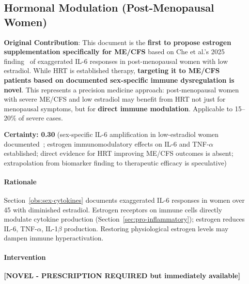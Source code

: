 \subsection{Hormonal Modulation (Post-Menopausal Women)}
\label{sec:hormonal-modulation}

\begin{speculation}
\label{spec:estrogen-immune-modulation}
\textbf{Original Contribution}: This document is the \textbf{first to propose estrogen supplementation specifically for ME/CFS} based on Che et al.'s 2025 finding~\cite{Che2025} of exaggerated IL-6 responses in post-menopausal women with low estradiol. While HRT is established therapy, \textbf{targeting it to ME/CFS patients based on documented sex-specific immune dysregulation is novel}. This represents a precision medicine approach: post-menopausal women with severe ME/CFS and low estradiol may benefit from HRT not just for menopausal symptoms, but for \textbf{direct immune modulation}. Applicable to 15--20\% of severe cases.

\textbf{Certainty: 0.30} (sex-specific IL-6 amplification in low-estradiol women documented~\cite{Che2025}; estrogen immunomodulatory effects on IL-6 and TNF-$\alpha$ established; direct evidence for HRT improving ME/CFS outcomes is absent; extrapolation from biomarker finding to therapeutic efficacy is speculative)
\end{speculation}

\paragraph{Rationale}
Section~\ref{obs:sex-cytokines} documents exaggerated IL-6 responses in women over 45 with diminished estradiol. Estrogen receptors on immune cells directly modulate cytokine production (Section~\ref{sec:pro-inflammatory}); estrogen reduces IL-6, TNF-$\alpha$, IL-1$\beta$ production. Restoring physiological estrogen levels may dampen immune hyperactivation.

\paragraph{Intervention}

\textbf{[NOVEL - PRESCRIPTION REQUIRED but immediately available]}

